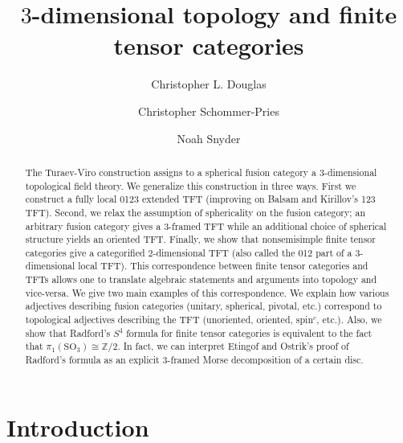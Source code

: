 \documentclass{amsart}
\begin{document}
\title{$3$-dimensional topology and finite tensor categories}

\begin{abstract}
The Turaev-Viro construction assigns to a spherical fusion category a 3-dimensional topological field theory.  We generalize this construction in three ways. First we construct a fully local 0123 extended TFT (improving on Balsam and Kirillov's 123 TFT).  Second, we relax the assumption of sphericality on the fusion category; an arbitrary fusion category gives a $3$-framed TFT while an additional choice of spherical structure yields an oriented TFT.  Finally, we show that nonsemisimple finite tensor categories give a categorified $2$-dimensional TFT (also called the 012 part of a 3-dimensional local TFT).  This correspondence between finite tensor categories and TFTs allows one to translate algebraic statements and arguments into topology and vice-versa.  We give two main examples of this correspondence.  We explain how various adjectives describing fusion categories (unitary, spherical, pivotal, etc.) correspond to topological adjectives describing the TFT (unoriented, oriented, spin${}^c$, etc.).  Also, we show that Radford's $S^4$ formula for finite tensor categories is equivalent to the fact that $\pi_1(\mathrm{SO}_3) \cong \mathbb{Z}/2$.  In fact, we can interpret Etingof and Ostrik's proof of Radford's formula as an explicit $3$-framed Morse decomposition of a certain disc.
\end{abstract}
	
\author{Christopher L. Douglas}
\address{Department of Mathematics, University of California, Berkeley, CA 94720, USA}
	
\author{Christopher Schommer-Pries}
\address{Department of Mathematics \\
} %

\author{Noah Snyder}
\address{}

\maketitle	
\setcounter{tocdepth}{3}
\tableofcontents

\section{Introduction}
\end{document}
